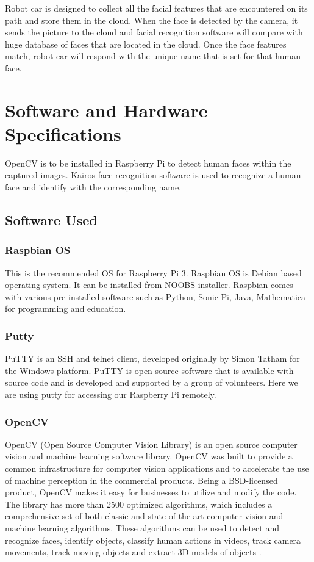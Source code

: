 \documentclass[sigconf]{acmart}
\begin{document}
Robot car is designed to collect all the facial features that are encountered on its path and store them in the cloud. When the face is detected by the camera, it sends the picture to the cloud and facial recognition software will compare with huge database of faces that are located in the cloud. Once the face features match, robot car will respond with the unique name that is set for that human face.

\section{Software and Hardware Specifications}
OpenCV is to be installed in Raspberry Pi to detect human faces within the captured images. Kairos face recognition software is used to recognize a human face and identify with the corresponding name.

\subsection{Software Used}

\subsubsection{Raspbian OS}
This is the recommended OS for Raspberry Pi 3. Raspbian OS is Debian based operating system. It can be installed from NOOBS installer. Raspbian comes with various pre-installed software such as Python, Sonic Pi, Java, Mathematica for programming and education.
\subsubsection{Putty}
PuTTY is an SSH and telnet client, developed originally by Simon Tatham for the Windows platform. PuTTY is open source software that is available with source code and is developed and supported by a group of volunteers. Here we are using putty for accessing our Raspberry Pi remotely.

\subsubsection{OpenCV}
OpenCV (Open Source Computer Vision Library) is an open source computer vision and machine learning software library. OpenCV was built to provide a common infrastructure for computer vision applications and to accelerate the use of machine perception in the commercial products. Being a BSD-licensed product, OpenCV makes it easy for businesses to utilize and modify the code. The library has more than 2500 optimized algorithms, which includes a comprehensive set of both classic and state-of-the-art computer vision and machine learning algorithms. These algorithms can be used to detect and recognize faces, identify objects, classify human actions in videos, track camera movements, track moving objects and extract 3D models of objects \cite{opencv}.
\end{document}
